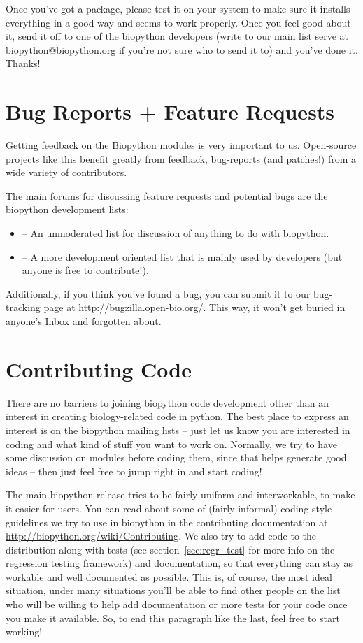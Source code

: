 \documentclass{report}
\begin{document}
Once you've got a package, please test it on your system to make sure it installs everything in a good way and seems to work properly. Once you feel good about it, send it off to one of the biopython developers (write to our main list serve at biopython@biopython.org if you're not sure who to send it to) and you've done it. Thanks!

\section{Bug Reports + Feature Requests}

Getting feedback on the Biopython modules is very important to us. Open-source projects like this benefit greatly from feedback, bug-reports (and patches!) from a wide variety of contributors.


The main forums for discussing feature requests and potential bugs are the biopython development lists:

\begin{itemize}
  \item {} -- An unmoderated list for discussion of anything to do with biopython.

  \item {} -- A more development oriented list that is mainly used by developers (but anyone is free to contribute!).
\end{itemize}

Additionally, if you think you've found a bug, you can submit it to our
bug-tracking page at \url{http://bugzilla.open-bio.org/}. This 
way, it won't get buried in anyone's Inbox and forgotten about.

\section{Contributing Code}

There are no barriers to joining biopython code development other than an interest in creating biology-related code in python. The best place to express an interest is on the biopython mailing lists -- just let us know you are interested in coding and what kind of stuff you want to work on. Normally, we try to have some discussion on modules before coding them, since that helps generate good ideas -- then just feel free to jump right in and start coding!


The main biopython release tries to be fairly uniform and interworkable,
to make it easier for users. You can read about some of (fairly
informal) coding style guidelines we try to use in biopython in the
contributing documentation at 
\url{http://biopython.org/wiki/Contributing}. We also try to add code to the distribution along with tests (see section~\ref{sec:regr_test} for more info on the regression testing framework) and documentation, so that everything can stay as workable and well documented as possible. This is, of course, the most ideal situation, under many situations you'll be able to find other people on the list who will be willing to help add documentation or more tests for your code once you make it available. So, to end this paragraph like the last, feel free to start working!
\end{document}
